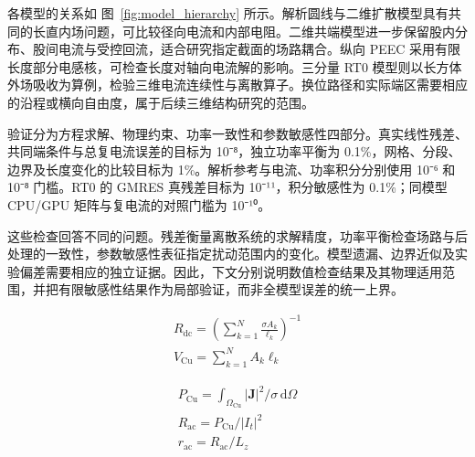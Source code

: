 \hypertarget{02.hierarchy.p1}{}
各模型的关系如 图~\ref{fig:model_hierarchy} 所示。解析圆线与二维扩散模型具有共同的长直内场问题，可比较径向电流和内部电阻。二维共端模型进一步保留股内分布、股间电流与受控回流，适合研究指定截面的场路耦合。纵向 PEEC 采用有限长度部分电感核，可检查长度对轴向电流解的影响。三分量 RT0 模型则以长方体外场吸收为算例，检验三维电流连续性与离散算子。换位路径和实际端区需要相应的沿程或横向自由度，属于后续三维结构研究的范围。

\hypertarget{02.hierarchy.p2}{}
验证分为方程求解、物理约束、功率一致性和参数敏感性四部分。真实线性残差、共同端条件与总复电流误差的目标为 10⁻⁸，独立功率平衡为 0.1\%，网格、分段、边界及长度变化的比较目标为 1\%。解析参考与电流、功率积分分别使用 10⁻⁶ 和 10⁻⁸ 门槛。RT0 的 GMRES 真残差目标为 10⁻¹¹，积分敏感性为 0.1\%；同模型 CPU/GPU 矩阵与复电流的对照门槛为 10⁻¹⁰。

\hypertarget{02.hierarchy.p3}{}
这些检查回答不同的问题。残差衡量离散系统的求解精度，功率平衡检查场路与后处理的一致性，参数敏感性表征指定扰动范围内的变化。模型遗漏、边界近似及实验偏差需要相应的独立证据。因此，下文分别说明数值检查结果及其物理适用范围，并把有限敏感性结果作为局部验证，而非全模型误差的统一上界。

\hypertarget{02.equation.E01}{}
\hypertarget{E01}{}
\begin{equation}
\begin{gathered}
R_{\mathrm{dc}}=\left(\sum_{k=1}^{N}\frac{\sigma A_k}{\ell_k}\right)^{-1} \\
V_{\mathrm{Cu}}=\sum_{k=1}^{N}A_k\ell_k
\end{gathered}
\tag{1}\label{eq:E01}
\end{equation}

\hypertarget{02.equation.E02}{}
\hypertarget{E02}{}
\begin{equation}
\begin{gathered}
P_{\mathrm{Cu}}=\int_{\Omega_{\mathrm{Cu}}}|\mathbf J|^2/\sigma\,\mathrm d\Omega \\
R_{\mathrm{ac}}=P_{\mathrm{Cu}}/|I_t|^2 \\
r_{\mathrm{ac}}=R_{\mathrm{ac}}/L_z
\end{gathered}
\tag{2}\label{eq:E02}
\end{equation}
